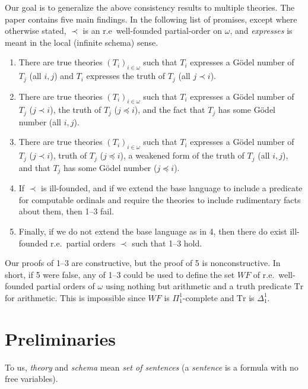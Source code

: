\documentclass[reqno]{article}
\theoremstyle{definition}
\def\Tr{\mathrm{Tr}}
\begin{document}
Our goal is to generalize the above consistency results to multiple theories.
The paper contains five main findings.
In the following list of promises, except where otherwise stated, $\prec$ is an r.e~well-founded partial-order
on $\omega$, and \emph{expresses} is meant in the local (infinite schema) sense.
\begin{enumerate}
\item There are true theories $(T_i)_{i\in \omega}$
such that $T_i$ expresses a G\"odel number of $T_j$ (all $i,j$)
and $T_i$ expresses the truth of $T_j$ (all $j\prec i$).
\item There are true theories $(T_i)_{i\in \omega}$
such that $T_i$ expresses a G\"odel number of $T_j$ ($j\prec i$),
the truth of $T_j$ ($j\preceq i$),
and the fact that $T_j$ has some G\"odel number (all $i,j$).
\item There are true theories $(T_i)_{i\in\omega}$
such that $T_i$ expresses a G\"odel number of $T_j$ ($j\prec i$),
truth of $T_j$ ($j\preceq i$),
a weakened form of the truth of $T_j$ (all $i,j$),
and that $T_j$ has some G\"odel number ($j\preceq i$).
\item If $\prec$ is ill-founded, and if we extend
the base language to include a predicate for computable
ordinals and require the theories to include rudimentary facts about
them, then 1--3 fail.
\item Finally, if we do not extend the base language as in 4,
then there do exist ill-founded r.e.~partial orders $\prec$ such that 1--3 hold.
\end{enumerate}
Our proofs of 1--3 are constructive, but the proof of 5 is
nonconstructive.  In short, if 5 were false, any of 1--3 could be used
to define the set $WF$ of r.e.~well-founded partial orders of $\omega$
using nothing but arithmetic and a truth predicate $\Tr$ for arithmetic. 
This is impossible since $WF$ is $\Pi^1_1$-complete and $\Tr$ is $\Delta^1_1$.


\section{Preliminaries}
\label{prelimsect}

To us, \emph{theory} and \emph{schema} mean \emph{set of sentences}
(a \emph{sentence}
is a formula with no free variables).
\end{document}
